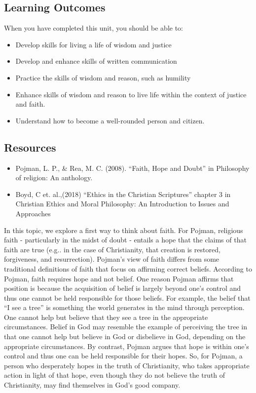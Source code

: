 \documentclass[
]{book}
\providecommand{\tightlist}{%
  \setlength{\itemsep}{0pt}\setlength{\parskip}{0pt}}
\begin{document}
\hypertarget{learning-outcomes-2}{%
\subsection*{Learning Outcomes}\label{learning-outcomes-2}}

When you have completed this unit, you should be able to:

\begin{itemize}
\tightlist
\item
  Develop skills for living a life of wisdom and justice
\item
  Develop and enhance skills of written communication
\item
  Practice the skills of wisdom and reason, such as humility
\item
  Enhance skills of wisdom and reason to live life within the context of justice and faith.
\item
  Understand how to become a well-rounded person and citizen.
\end{itemize}

\hypertarget{resources-2}{%
\subsection*{Resources}\label{resources-2}}

\begin{itemize}
\tightlist
\item
  Pojman, L. P., \& Rea, M. C. (2008). ``Faith, Hope and Doubt'' in Philosophy of religion: An anthology.
\item
  Boyd, C et. al.,(2018) ``Ethics in the Christian Scriptures'' chapter 3 in Christian Ethics and Moral Philosophy: An Introduction to Issues and Approaches
\end{itemize}

In this topic, we explore a first way to think about faith. For Pojman, religious faith - particularly in the midst of doubt - entails a hope that the claims of that faith are true (e.g.. in the case of Christianity, that creation is restored, forgiveness, and resurrection). Pojman's view of faith differs from some traditional definitions of faith that focus on affirming correct beliefs. According to Pojman, faith requires hope and not belief. One reason Pojman affirms that position is because the acquisition of belief is largely beyond one's control and thus one cannot be held responsible for those beliefs. For example, the belief that ``I see a tree'' is something the world generates in the mind through perception. One cannot help but believe that they see a tree in the appropriate circumstances. Belief in God may resemble the example of perceiving the tree in that one cannot help but believe in God or disbelieve in God, depending on the appropriate circumstances. By contrast, Pojman argues that hope is within one's control and thus one can be held responsible for their hopes. So, for Pojman, a person who desperately hopes in the truth of Christianity, who takes appropriate action in light of that hope, even though they do not believe the truth of Christianity, may find themselves in God's good company.
\end{document}
